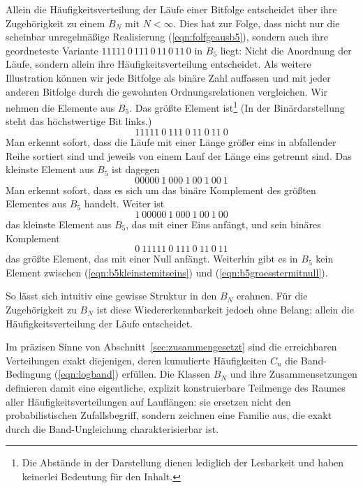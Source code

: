 \documentclass[11pt,a4paper]{scrartcl}
\theoremstyle{plain}
\theoremstyle{definition}
\theoremstyle{remark}
\begin{document}
Allein die Häufigkeitsverteilung der Läufe einer Bitfolge entscheidet
über ihre Zugehörigkeit zu einem $B_N$ mit $N<\infty$. Dies hat zur
Folge, dass nicht nur die scheinbar unregelmäßige Realisierung
(\ref{eqn:folfgeausb5}), sondern auch ihre geordneteste Variante
$11111\,0\,111\,0\,11\,0\,11\,0$ in $B_5$ liegt: Nicht die
Anordnung der Läufe, sondern allein ihre Häufigkeitsverteilung
entscheidet. Als weitere Illustration können wir jede Bitfolge
als binäre Zahl auffassen und mit jeder anderen Bitfolge durch die
gewohnten Ordnungsrelationen vergleichen. Wir nehmen die Elemente aus
$B_5$. Das größte Element ist\footnote{Die Abstände in der Darstellung
dienen lediglich der Lesbarkeit und haben keinerlei Bedeutung für den
Inhalt.}
(In der Binärdarstellung steht das höchstwertige Bit links.)
\begin{equation}
  11111\ 0\ 111\ 0\ 11\ 0\ 11\ 0
\end{equation}
Man erkennt sofort, dass die Läufe mit einer Länge größer eins in
abfallender Reihe sortiert sind und jeweils von einem Lauf der Länge
eins getrennt sind. Das kleinste Element aus $B_5$ ist dagegen
\begin{equation}
  00000\ 1\ 000\ 1\ 00\ 1\ 00\ 1
\end{equation}
Man erkennt sofort, dass es sich um das binäre Komplement des größten
Elementes aus $B_5$ handelt. Weiter ist
\begin{equation}\label{eqn:b5kleinstemitseins}
  1\ 00000\ 1\ 000\ 1\ 00\ 1\ 00
\end{equation}
das kleinste Element aus $B_5$, das mit einer Eins anfängt, und sein
binäres Komplement
\begin{equation}\label{eqn:b5groesstermitnull}
  0\ 11111\ 0\ 111\ 0\ 11\ 0\ 11
\end{equation}
das größte Element, das mit einer Null anfängt. Weiterhin gibt es in
$B_5$ kein Element zwischen (\ref{eqn:b5kleinstemitseins}) und
(\ref{eqn:b5groesstermitnull}).

\noindent So lässt sich intuitiv eine gewisse Struktur in den $B_N$
erahnen. Für die Zugehörigkeit zu $B_N$ ist diese Wiedererkennbarkeit
jedoch ohne Belang; allein die Häufigkeitsverteilung der Läufe
entscheidet.

Im präzisen Sinne von Abschnitt~\ref{sec:zusammengesetzt} sind die
erreichbaren Verteilungen exakt diejenigen, deren kumulierte
Häufigkeiten $C_n$ die Band-Bedingung (\ref{eqn:logband}) erfüllen.
Die Klassen $B_N$ und ihre Zusammensetzungen definieren damit eine
eigentliche, explizit konstruierbare Teilmenge des Raumes aller
Häufigkeitsverteilungen auf Lauflängen: sie ersetzen nicht den
probabilistischen Zufallsbegriff, sondern zeichnen eine Familie
aus, die exakt durch die Band-Ungleichung charakterisierbar ist.
\end{document}
